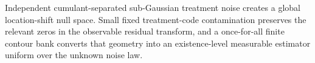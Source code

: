 Independent cumulant-separated sub-Gaussian treatment noise creates a global location-shift null space.  Small fixed treatment-code contamination preserves the relevant zeros in the observable residual transform, and a once-for-all finite contour bank converts that geometry into an existence-level measurable estimator uniform over the unknown noise law.